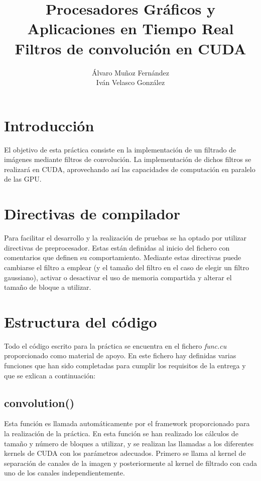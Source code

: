 \documentclass[10pt,oneside,a4paper]{article}
\begin{document}
\begin{titlepage}

\title{\Huge Procesadores Gráficos y Aplicaciones en Tiempo Real  \\[0.7in] \LARGE Filtros de convolución en CUDA\\[3.6in]}
\date{}
\author{Álvaro Muñoz Fernández\\
Iván Velasco González}
\maketitle
\thispagestyle{empty}
\end{titlepage}
\newpage
\tableofcontents
\newpage

\section{Introducción}
El objetivo de esta práctica consiste en la implementación de un filtrado de imágenes mediante filtros de convolución. La implementación de dichos filtros se realizará en CUDA, aprovechando así las capacidades de computación en paralelo de las GPU.\\

\section{Directivas de compilador}
Para facilitar el desarrollo y la realización de pruebas se ha optado por utilizar directivas de preprocesador. Estas están definidas al inicio del fichero con comentarios que definen su comportamiento. Mediante estas directivas puede cambiarse el filtro a emplear (y el tamaño del filtro en el caso de elegir un filtro gaussiano), activar o desactivar el uso de memoria compartida y alterar el tamaño de bloque a utilizar.

\section{Estructura del código}
Todo el código escrito para la práctica se encuentra en el fichero \textit{func.cu} proporcionado como material de apoyo. En este fichero hay definidas varias funciones que han sido completadas para cumplir los requisitos de la entrega y que se exlican a continuación:

\subsection{convolution()}
Esta función es llamada automáticamente por el framework proporcionado para la realización de la práctica. En esta función se han realizado los cálculos de tamaño y número de bloques a utilizar, y se realizan las llamadas a los diferentes kernels de CUDA con los parámetros adecuados. Primero se llama al kernel de separación de canales de la imagen y posteriormente al kernel de filtrado con cada uno de los canales independientemente.
\end{document}
